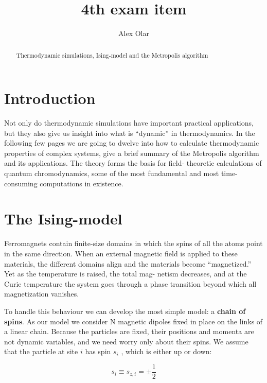 \documentclass[12pt]{article}
\theoremstyle{plain}
\begin{document}
\title{4th exam item}
\author{Alex Olar}

\maketitle

\newpage
\begin{abstract}
    Thermodynamic simulations, Ising-model and the Metropolis algorithm
\end{abstract}

\section{Introduction}

\par Not only do thermodynamic simulations
have important practical applications, but they also give us insight into what is “dynamic” in
thermodynamics. In the following few pages we are going
to dwelve into how to calculate thermodynamic properties of
complex systems, give a brief summary of the Metropolis algorithm and its 
applications. The theory forms the basis for field- theoretic calculations
of quantum chromodynamics, some of the most fundamental and most time-consuming
computations in existence.

\section{The Ising-model}

\par Ferromagnets contain finite-size domains in which the spins of all the atoms point in the same
direction. When an external magnetic field is applied to these materials, the different domains
align and the materials become “magnetized.” Yet as the temperature is raised, the total mag-
netism decreases, and at the Curie temperature the system goes through a phase transition
beyond which all magnetization vanishes.

\par To handle this behaviour we can develop the most simple model: a \textbf{chain of spins}. As our model
we consider N magnetic dipoles fixed in place on the links of a linear chain. Because
the particles are fixed, their positions and momenta are not dynamic variables, and we need
worry only about their spins. We assume that the particle at site $i$ has spin $s_{i}$ , which is either
up or down:

\begin{equation*}
    s_{i} \equiv s_{z, i} = \pm \frac{1}{2}
\end{equation*}
\end{document}
